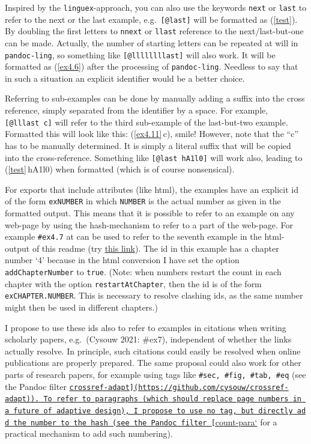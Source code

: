 \documentclass[
]{article}
\begin{document}
Inspired by the \texttt{linguex}-approach, you can also use the keywords
\texttt{next} or \texttt{last} to refer to the next or the last example,
e.g.~\texttt{{[}@last{]}} will be formatted as (\ref{test}). By doubling
the first letters to \texttt{nnext} or \texttt{llast} reference to the
next/last-but-one can be made. Actually, the number of starting letters
can be repeated at will in \texttt{pandoc-ling}, so something like
\texttt{{[}@llllllllast{]}} will also work. It will be formatted as
(\ref{ex4.6}) after the processing of \texttt{pandoc-ling}. Needless to
say that in such a situation an explicit identifier would be a better
choice.

Referring to sub-examples can be done by manually adding a suffix into
the cross reference, simply separated from the identifier by a space.
For example, \texttt{{[}@lllast~c{]}} will refer to the third
sub-example of the last-but-two example. Formatted this will look like
this: (\ref{ex4.11}\,c), smile! However, note that the ``c'' has to be
manually determined. It is simply a literal suffix that will be copied
into the cross-reference. Something like \texttt{{[}@last\ hA1l0{]}}
will work also, leading to (\ref{test}\,hA1l0) when formatted (which is
of course nonsensical).

For exports that include attributes (like html), the examples have an
explicit id of the form \texttt{exNUMBER} in which \texttt{NUMBER} is
the actual number as given in the formatted output. This means that it
is possible to refer to an example on any web-page by using the
hash-mechanism to refer to a part of the web-page. For example
\texttt{\#ex4.7} at can be used to refer to the seventh example in the
html-output of this readme (try
\href{https://cysouw.github.io/pandoc-ling/readme.html\#ex4.7}{this
link}). The id in this example has a chapter number `4' because in the
html conversion I have set the option \texttt{addChapterNumber} to
\texttt{true}. (Note: when numbers restart the count in each chapter
with the option \texttt{restartAtChapter}, then the id is of the form
\texttt{exCHAPTER.NUMBER}. This is necessary to resolve clashing ids, as
the same number might then be used in different chapters.)

I propose to use these ids also to refer to examples in citations when
writing scholarly papers, e.g.~(Cysouw 2021: \#ex7), independent of
whether the links actually resolve. In principle, such citations could
easily be resolved when online publications are properly prepared. The
same proposal could also work for other parts of research papers, for
example using tags like \texttt{\#sec,\ \#fig,\ \#tab,\ \#eq} (see the
Pandoc filter
\href{https://github.com/cysouw/count-para}{\texttt{crossref-adapt{]}(https://github.com/cysouw/crossref-adapt)).\ To\ refer\ to\ paragraphs\ (which\ should\ replace\ page\ numbers\ in\ a\ future\ of\ adaptive\ design),\ I\ propose\ to\ use\ no\ tag,\ but\ directly\ add\ the\ number\ to\ the\ hash\ (see\ the\ Pandoc\ filter\ {[}}count-para`}
for a practical mechanism to add such numbering).
\end{document}
